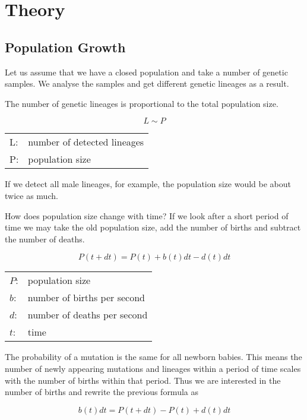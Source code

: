 \section{Theory}

\subsection{Population Growth}

Let us assume that we have a closed population and take a
number of genetic samples. We analyse the samples and get
different genetic lineages as a result.

The number of genetic lineages is proportional to the 
total population size.

\begin{equation}
L \sim P \label{lineages-population}
\end{equation}

\begin{tabular}{ll}
L:   & number of detected lineages\\
P:   & population size
\end{tabular}
\vspace{1em}

If we detect all male lineages, for example, the population
size would be about twice as much.

How does population size change with time? If we look after a
short period of time we may take the old population size, add
the number of births and subtract the number of deaths.

\begin{equation}
P(t+dt) = P(t) + b(t)dt - d(t)dt 
\end{equation}

\begin{tabular}{ll}
$P$: & population size\\
$b$: & number of births per second\\
$d$: & number of deaths per second\\
$t$: &time
\end{tabular}
\vspace{1em}

The probability of a mutation is the same for all newborn
babies. This means the number of newly appearing mutations
and lineages within a period of time scales with the number
of births within that period. Thus we are interested in the
number of births and rewrite the previous formula as

\begin{equation}
b(t)dt = P(t+dt) - P(t) + d(t)dt
\end{equation}

